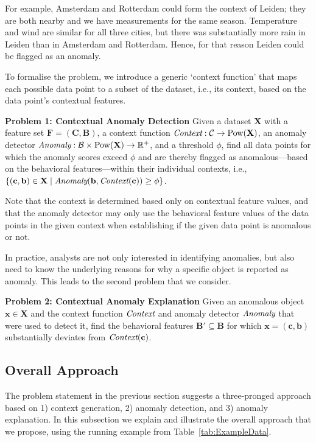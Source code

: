 \documentclass[pdflatex,sn-basic]{sn-jnl}%
\theoremstyle{thmstyleone}%
\DeclareMathOperator{\Pow}{Pow}
\newcommand{\anomaly}{\emph{Anomaly}}
\newcommand{\context}{\emph{Context}}
\theoremstyle{thmstyletwo}%
\theoremstyle{thmstylethree}%
\begin{document}
For example, Amsterdam and Rotterdam could form the context of Leiden; they are both nearby and we have measurements for the same season. Temperature and wind are similar for all three cities, but there was substantially more rain in Leiden than in Amsterdam and Rotterdam. Hence, for that reason Leiden could be flagged as an anomaly.

To formalise the problem, we introduce a generic `context function' that maps each possible data point to a subset of the dataset, i.e., its context, based on the data point's contextual features.

\textbf{Problem 1: Contextual Anomaly Detection} Given a dataset $\mathbf{X}$ with a feature set $\mathbf{F} = (\mathbf{C},\mathbf{B})$, a context function $\context : \mathcal{C} \rightarrow \Pow(\mathbf{X})$, an anomaly detector $\anomaly : \mathcal{B} \times \Pow(\mathbf{X}) \rightarrow \mathbb{R}^{+}$, and a threshold $\phi$, find all data points for which the anomaly scores exceed $\phi$ and are thereby flagged as anomalous---based on the behavioral features---within their individual contexts, i.e., $\{(\mathbf{c},\mathbf{b}) \in \mathbf{X} \mid \anomaly(\mathbf{b}, \context(\mathbf{c})) \geq \phi \}$.

Note that the context is determined based only on contextual feature values, and that the anomaly detector may only use the behavioral feature values of the data points in the given context when establishing if the given data point is anomalous or not.

In practice, analysts are not only interested in identifying anomalies, but also need to know the underlying reasons for why a specific object is reported as anomaly. This leads to the second problem that we consider.

\textbf{Problem 2: Contextual Anomaly Explanation} Given an anomalous object $\mathbf{x} \in \mathbf{X}$ and the context function $\context$ and anomaly detector $\anomaly$ that were used to detect it, find the behavioral features $\mathbf{B'} \subseteq \mathbf{B}$ for which $\mathbf{x} = (\mathbf{c}, \mathbf{b})$ substantially deviates from $\context(\mathbf{c})$.

\subsection{Overall Approach} \label{subsec:framework}

The problem statement in the previous section suggests a three-pronged approach based on 1) context generation, 2) anomaly detection, and 3) anomaly explanation. In this subsection we explain and illustrate the overall approach that we propose, using the running example from Table~\ref{tab:ExampleData}. 
\end{document}
